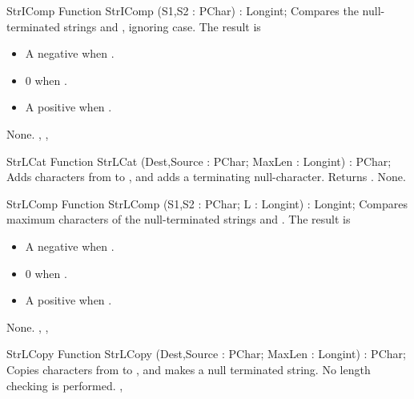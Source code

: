 
\begin{function}{StrIComp}
\Declaration
Function StrIComp (S1,S2 : PChar) : Longint;
\Description
Compares the null-terminated strings  and , ignoring case.
The result is 
\begin{itemize}
\item A negative  when .
\item 0 when .
\item A positive  when .
\end{itemize}
\Errors
None.
\SeeAlso
{}, , 
\end{function}


\begin{function}{StrLCat}
\Declaration
Function StrLCat (Dest,Source : PChar; MaxLen : Longint) : PChar;
\Description
Adds  characters from  to , and adds a
terminating null-character. Returns .
\Errors
None.
\SeeAlso
{}
\end{function}


\begin{function}{StrLComp}
\Declaration
Function StrLComp (S1,S2 : PChar; L : Longint) : Longint;
\Description
Compares maximum  characters of the null-terminated strings 
 and . 
The result is 
\begin{itemize}
\item A negative  when .
\item 0 when .
\item A positive  when .
\end{itemize}
\Errors
None.
\SeeAlso
{}, , 
\end{function}


\begin{function}{StrLCopy}
\Declaration
Function StrLCopy (Dest,Source : PChar; MaxLen : Longint) : PChar;
\Description
Copies  characters from  to , and makes
 a null terminated string. 
\Errors
No length checking is performed.
\SeeAlso
{}, 
\end{function}


